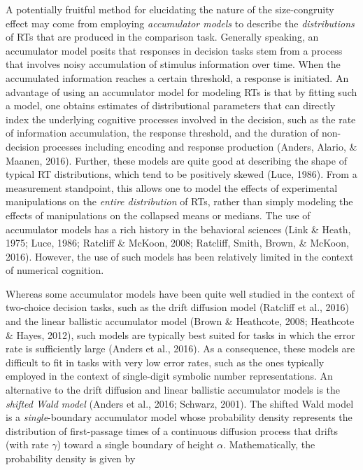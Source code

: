 \documentclass[english,man]{apa6}
\theoremstyle{definition}
\theoremstyle{definition}
\theoremstyle{definition}
\theoremstyle{remark}
\begin{document}
A potentially fruitful method for elucidating the nature of the
size-congruity effect may come from employing \emph{accumulator models}
to describe the \emph{distributions} of RTs that are produced in the
comparison task. Generally speaking, an accumulator model posits that
responses in decision tasks stem from a process that involves noisy
accumulation of stimulus information over time. When the accumulated
information reaches a certain threshold, a response is initiated. An
advantage of using an accumulator model for modeling RTs is that by
fitting such a model, one obtains estimates of distributional parameters
that can directly index the underlying cognitive processes involved in
the decision, such as the rate of information accumulation, the response
threshold, and the duration of non-decision processes including encoding
and response production (Anders, Alario, \& Maanen, 2016). Further,
these models are quite good at describing the shape of typical RT
distributions, which tend to be positively skewed (Luce, 1986). From a
measurement standpoint, this allows one to model the effects of
experimental manipulations on the \emph{entire distribution} of RTs,
rather than simply modeling the effects of manipulations on the
collapsed means or medians. The use of accumulator models has a rich
history in the behavioral sciences (Link \& Heath, 1975; Luce, 1986;
Ratcliff \& McKoon, 2008; Ratcliff, Smith, Brown, \& McKoon, 2016).
However, the use of such models has been relatively limited in the
context of numerical cognition.

Whereas some accumulator models have been quite well studied in the
context of two-choice decision tasks, such as the drift diffusion model
(Ratcliff et al., 2016) and the linear ballistic accumulator model
(Brown \& Heathcote, 2008; Heathcote \& Hayes, 2012), such models are
typically best suited for tasks in which the error rate is sufficiently
large (Anders et al., 2016). As a consequence, these models are
difficult to fit in tasks with very low error rates, such as the ones
typically employed in the context of single-digit symbolic number
representations. An alternative to the drift diffusion and linear
ballistic accumulator models is the \emph{shifted Wald model} (Anders et
al., 2016; Schwarz, 2001). The shifted Wald model is a
\emph{single}-boundary accumulator model whose probability density
represents the distribution of first-passage times of a continuous
diffusion process that drifts (with rate \(\gamma\)) toward a single
boundary of height \(\alpha\). Mathematically, the probability density
is given by
\end{document}
